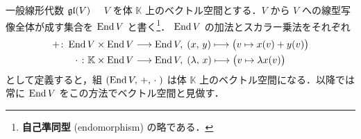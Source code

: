 \documentclass[rep_main]{subfiles}
\begin{document}
\begin{myexample}[label=def:gl-alg]{一般線形代数 $\mathfrak{gl} (V)$}
    　$V$ を体 $\mathbb{K}$ 上のベクトル空間とする．$V$ から $V$ への線型写像全体が成す集合を $\operatorname{End} V$ と書く\footnote{\textbf{自己準同型} (endomorphism) の略である．}．
    $\operatorname{End} V$ の加法とスカラー乗法をそれぞれ
    \begin{align}
        + \colon \operatorname{End} V \times \operatorname{End} V &\longrightarrow \operatorname{End} V,\; (x,\, y) \longmapsto \bigl( v \mapsto x(v) + y(v) \bigr) \\
        \cdot\; \colon \mathbb{K} \times \operatorname{End} V &\longrightarrow \operatorname{End} V,\; (\lambda,\, x) \longmapsto \bigl( v \mapsto \lambda x(v) \bigr)
    \end{align}
    として定義すると，組 $(\operatorname{End} V,\, +,\, \cdot\; )$ は体 $\mathbb{K}$ 上のベクトル空間になる．以降では常に $\operatorname{End} V$ をこの方法でベクトル空間と見做す．


\end{myexample}
\end{document}
